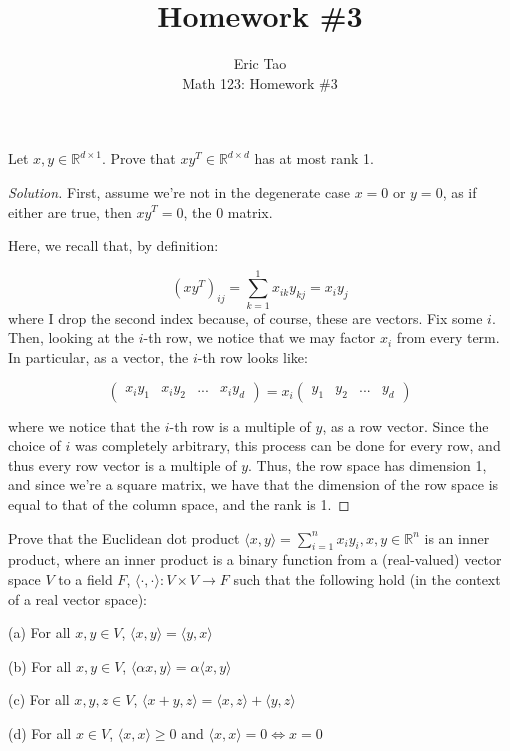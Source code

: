 \documentclass[10pt]{article}
\newenvironment{problem}[2][]{\begin{trivlist}
\item[\hskip \labelsep {\bfseries #1}\hskip \labelsep {\bfseries #2.}]}{\end{trivlist}}
\begin{document}
 
\title{Homework \#3}
\author{Eric Tao\\
Math 123: Homework \#3}
\maketitle

\begin{problem}{Question 1}
Let $x,y \in \mathbb{R}^{d \times 1}$. Prove that $xy^T \in \mathbb{R}^{d \times d}$ has at most rank 1.

\end{problem}
\begin{proof}[Solution]

First, assume we're not in the degenerate case $x = 0$ or $y = 0$, as if either are true, then $xy^T = 0$, the 0 matrix.

Here, we recall that, by definition:

$$(xy^T)_{ij} = \sum_{k=1}^1 x_{ik}y_{kj} = x_i y_j$$ where I drop the second index because, of course, these are vectors. Fix some $i$. Then, looking at the $i$-th row, we notice that we may factor $x_i$ from every term. In particular, as a vector, the $i$-th row looks like:

$$ \begin{pmatrix} x_i y_1 & x_i y_2 & ... & x_i y_d \end{pmatrix} =  x_i \begin{pmatrix} y_1 & y_2 & ... & y_d \end{pmatrix} $$

where we notice that the $i$-th row is a multiple of $y$, as a row vector. Since the choice of $i$ was completely arbitrary, this process can be done for every row, and thus every row vector is a multiple of $y$. Thus, the row space has dimension 1, and since we're a square matrix, we have that the dimension of the row space is equal to that of the column space, and the rank is 1.

\end{proof}

\begin{problem}{Question 2}
Prove that the Euclidean dot product $\langle x, y \rangle = \sum_{i=1}^n x_i y_i, x, y \in \mathbb{R}^n$ is an inner product, where an inner product is a binary function from a (real-valued) vector space $V$ to a field $F$, $\langle \cdot, \cdot \rangle: V \times V \to F$ such that the following hold (in the context of a real vector space):

(a) For all $x,y \in V$, $\langle x,y \rangle =\langle y,x \rangle$

(b) For all $x,y \in V$, $\langle \alpha x,y \rangle =\alpha \langle x,y \rangle$

(c) For all $x,y, z \in V$, $\langle  x + y,z \rangle =\langle x,z \rangle + \langle y,z \rangle$

(d) For all $x\in V$, $\langle x,x \rangle \geq 0$ and $\langle x,x \rangle = 0 \iff x = 0$

\end{problem}
\end{document}
